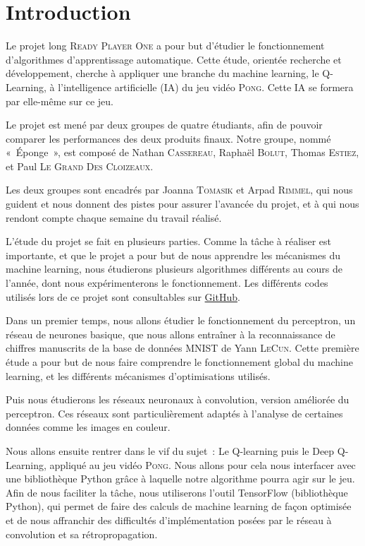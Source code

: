 \section*{Introduction}

Le projet long \textsc{Ready Player One} a pour but d’étudier le fonctionnement d’algorithmes d'apprentissage automatique. Cette étude, 
orientée recherche et développement, cherche à appliquer une branche du machine learning, le Q-Learning, à l’intelligence artificielle (IA)
du jeu vidéo \textsc{Pong}. Cette IA se formera par elle-même sur ce jeu.

Le projet est mené par deux groupes de quatre étudiants, afin de pouvoir comparer les performances des deux produits finaux. 
Notre groupe, nommé « Éponge », est composé de Nathan \textsc{Cassereau}, Raphaël \textsc{Bolut}, Thomas \textsc{Estiez}, et 
Paul \textsc{Le Grand Des Cloizeaux}. 

Les deux groupes sont encadrés par Joanna \textsc{Tomasik} et Arpad \textsc{Rimmel}, qui nous guident et nous donnent des pistes
pour assurer l'avancée du projet, et à qui nous rendont compte chaque semaine du travail réalisé.

L’étude du projet se fait en plusieurs parties. Comme la tâche à réaliser est importante, et que le projet a pour but 
de nous apprendre les mécanismes du machine learning, nous étudierons plusieurs algorithmes différents au cours de l’année, dont nous expérimenterons
le fonctionnement. 
Les différents codes utilisés lors de ce projet sont consultables sur \href{https://github.com/ready-player-one-supelec}{GitHub}.

Dans un premier temps, nous allons étudier le fonctionnement du perceptron, un réseau de neurones basique, que nous allons entraîner 
à la reconnaissance de chiffres manuscrits de la base de données MNIST de Yann \textsc{LeCun}. Cette première étude a pour but de nous faire 
comprendre le fonctionnement global du machine learning, et les différents mécanismes d’optimisations utilisés.
 
Puis nous étudierons les réseaux neuronaux à convolution, version améliorée du perceptron. Ces réseaux sont particulièrement adaptés à l'analyse
de certaines données comme les images en couleur.

Nous allons ensuite rentrer dans le vif du sujet : Le Q-learning puis le Deep Q-Learning, appliqué au jeu vidéo \textsc{Pong}. 
Nous allons pour cela nous interfacer avec une bibliothèque Python grâce à laquelle notre algorithme pourra agir sur le jeu. Afin de nous faciliter la tâche, nous 
utiliserons l’outil TensorFlow (bibliothèque Python), qui permet de faire des calculs de machine learning de façon optimisée et de nous affranchir
des difficultés d'implémentation posées par le réseau à convolution et sa rétropropagation.
